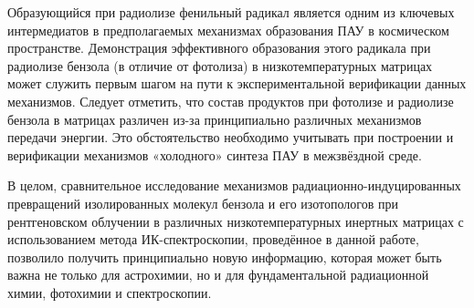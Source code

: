 {Образующийся при радиолизе фенильный радикал является одним из ключевых интермедиатов  в предполагаемых механизмах образования ПАУ в космическом пространстве. Демонстрация эффективного образования этого радикала при радиолизе бензола (в отличие от фотолиза) в низкотемпературных матрицах может служить первым шагом на пути к экспериментальной верификации данных механизмов. Следует отметить, что состав продуктов при фотолизе и радиолизе бензола в матрицах различен из-за принципиально различных механизмов передачи энергии. Это обстоятельство необходимо учитывать при построении и верификации механизмов «холодного» синтеза ПАУ в межзвёздной среде.

В целом, сравнительное исследование механизмов радиационно-индуцированных превращений изолированных молекул бензола и его изотопологов при рентгеновском облучении в различных низкотемпературных инертных матрицах с использованием метода ИК-спектроскопии,  проведённое в данной работе, позволило получить принципиально новую информацию, которая может быть важна не только для астрохимии, но и для фундаментальной радиационной химии, фотохимии и спектроскопии.

}